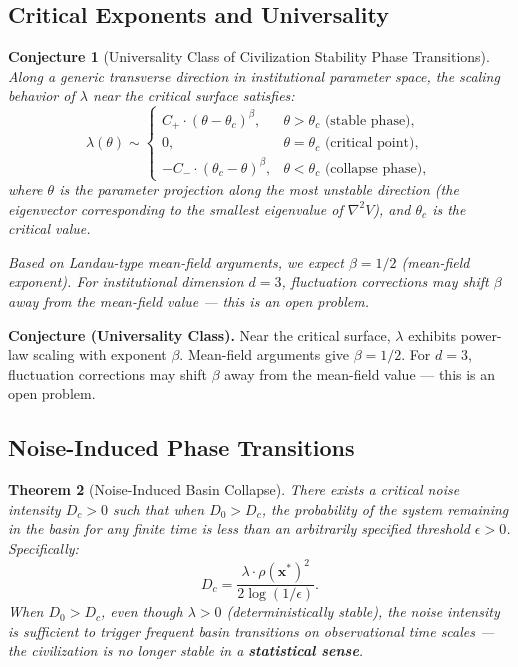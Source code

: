 \documentclass[12pt,a4paper]{article}
\newtheorem{theorem}{Theorem}[section]
\newtheorem{conjecture}[theorem]{Conjecture}
\theoremstyle{definition}
\newcommand{\lb}{\lambda}
\newcommand{\Lyap}{V}
\begin{document}
\subsection{Critical Exponents and Universality}
\label{sec:critical_exponents}

\begin{conjecture}[Universality Class of Civilization Stability Phase Transitions]
\label{conj:universality}
Along a generic transverse direction in institutional parameter space, the scaling behavior of $\lb$ near the critical surface satisfies:
\begin{equation}\label{eq:scaling}
    \lb(\theta) \sim \begin{cases}
        C_{+} \cdot (\theta - \theta_c)^{\beta}, & \theta > \theta_c \text{ (stable phase)}, \\
        0, & \theta = \theta_c \text{ (critical point)}, \\
        -C_{-} \cdot (\theta_c - \theta)^{\beta}, & \theta < \theta_c \text{ (collapse phase)},
    \end{cases}
\end{equation}
where $\theta$ is the parameter projection along the most unstable direction (the eigenvector corresponding to the smallest eigenvalue of $\nabla^2 \Lyap$), and $\theta_c$ is the critical value.

Based on Landau-type mean-field arguments, we expect $\beta = 1/2$ (mean-field exponent). For institutional dimension $d=3$, fluctuation corrections may shift $\beta$ away from the mean-field value --- this is an open problem.
\end{conjecture}

\noindent
\textbf{Conjecture (Universality Class).}
Near the critical surface, $\lb$ exhibits power-law scaling with exponent $\beta$. Mean-field arguments give $\beta = 1/2$. For $d=3$, fluctuation corrections may shift $\beta$ away from the mean-field value --- this is an open problem.

\subsection{Noise-Induced Phase Transitions}
\label{sec:noise_phase}

\begin{theorem}[Noise-Induced Basin Collapse]
\label{thm:noise_collapse}
There exists a critical noise intensity $D_c > 0$ such that when $D_0 > D_c$, the probability of the system remaining in the basin for any finite time is less than an arbitrarily specified threshold $\epsilon > 0$. Specifically:
\begin{equation}\label{eq:noise_critical}
    D_c = \frac{\lb \cdot \rho(\mathbf{x}^*)^2}{2 \log(1/\epsilon)}.
\end{equation}
When $D_0 > D_c$, even though $\lb > 0$ (deterministically stable), the noise intensity is sufficient to trigger frequent basin transitions on observational time scales --- the civilization is no longer stable in a \textbf{statistical sense}.
\end{theorem}
\end{document}
